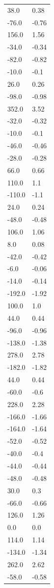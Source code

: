 \begin{longtable}{ll}
38.0 & 0.38 \\
-76.0 & -0.76 \\
156.0 & 1.56 \\
-34.0 & -0.34 \\
-82.0 & -0.82 \\
-10.0 & -0.1 \\
26.0 & 0.26 \\
-98.0 & -0.98 \\
352.0 & 3.52 \\
-32.0 & -0.32 \\
-10.0 & -0.1 \\
-46.0 & -0.46 \\
-28.0 & -0.28 \\
66.0 & 0.66 \\
110.0 & 1.1 \\
-110.0 & -1.1 \\
24.0 & 0.24 \\
-48.0 & -0.48 \\
106.0 & 1.06 \\
8.0 & 0.08 \\
-42.0 & -0.42 \\
-6.0 & -0.06 \\
-14.0 & -0.14 \\
-192.0 & -1.92 \\
100.0 & 1.0 \\
44.0 & 0.44 \\
-96.0 & -0.96 \\
-138.0 & -1.38 \\
278.0 & 2.78 \\
-182.0 & -1.82 \\
44.0 & 0.44 \\
-60.0 & -0.6 \\
228.0 & 2.28 \\
-166.0 & -1.66 \\
-164.0 & -1.64 \\
-52.0 & -0.52 \\
-40.0 & -0.4 \\
-44.0 & -0.44 \\
-48.0 & -0.48 \\
30.0 & 0.3 \\
-66.0 & -0.66 \\
126.0 & 1.26 \\
0.0 & 0.0 \\
114.0 & 1.14 \\
-134.0 & -1.34 \\
262.0 & 2.62 \\
-58.0 & -0.58 \\

\end{longtable}
